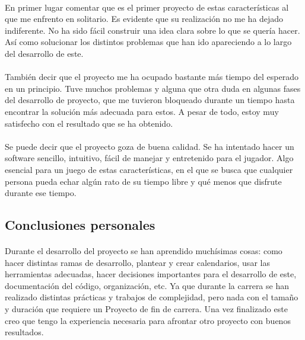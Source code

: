 \documentclass[a4paper,11pt]{article} %
\begin{document}
\paragraph{}
En primer lugar comentar que es el primer proyecto de estas características al que me enfrento en solitario. Es evidente que su
realización no me ha dejado indiferente. No ha sido fácil construir una idea clara sobre lo que se quería hacer. Así como
solucionar los distintos problemas que han ido apareciendo a lo largo del desarrollo de este.

\paragraph{}
También decir que el proyecto me ha ocupado bastante más tiempo del esperado en un principio. Tuve muchos problemas y alguna que 
otra duda en algunas fases del desarrollo de proyecto, que me tuvieron bloqueado durante un tiempo hasta encontrar la solución
más adecuada para estos. A pesar de todo, estoy muy satisfecho con el resultado que se ha obtenido.

\paragraph{}
Se puede decir que el proyecto goza de buena calidad. Se ha intentado hacer un
software sencillo, intuitivo, fácil de manejar y 
entretenido para el jugador. Algo esencial para un juego de estas características, en el que se busca que cualquier persona
pueda echar algún rato de su tiempo libre y qué menos que disfrute durante ese tiempo.

\subsection{Conclusiones personales}

\paragraph{}
Durante el desarrollo del proyecto se han aprendido muchísimas cosas: como hacer distintas ramas de desarrollo, plantear y crear
calendarios, usar las herramientas adecuadas, hacer decisiones importantes para el desarrollo de este, documentación del 
código, organización, etc. Ya que durante la carrera se han realizado distintas prácticas y trabajos de complejidad, pero nada
con el tamaño y duración que requiere un Proyecto de fin de carrera. Una vez finalizado este creo que tengo la experiencia necesaria
para afrontar otro proyecto con buenos resultados.
\end{document}
